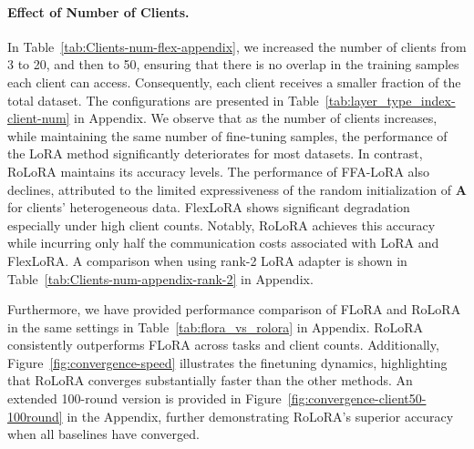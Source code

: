 \documentclass{article}
\theoremstyle{plain}
\theoremstyle{definition}
\theoremstyle{remark}
\begin{document}
\paragraph{Effect of Number of Clients.}
In Table~\ref{tab:Clients-num-flex-appendix}, we increased the number of clients from 3 to 20, and then to 50, ensuring that there is no overlap in the training samples each client can access. Consequently, each client receives a smaller fraction of the total dataset. The configurations are presented in Table~\ref{tab:layer_type_index-client-num} in Appendix. We observe that as the number of clients increases, while maintaining the same number of fine-tuning samples, the performance of the LoRA method significantly deteriorates for most datasets. In contrast, RoLoRA maintains its accuracy levels. The performance of FFA-LoRA also declines, attributed to the limited expressiveness of the random initialization of $\mathbf{A}$ for clients' heterogeneous data. FlexLoRA shows significant degradation especially under high client counts. Notably, RoLoRA achieves this accuracy while incurring only half the communication costs associated with LoRA and FlexLoRA. A comparison when using rank-2 LoRA adapter is shown in Table~\ref{tab:Clients-num-appendix-rank-2} in Appendix.

Furthermore, we have provided performance comparison of FLoRA and RoLoRA in the same settings in Table~\ref{tab:flora_vs_rolora} in Appendix. RoLoRA consistently outperforms FLoRA across tasks and client counts. 
Additionally, Figure~\ref{fig:convergence-speed} illustrates the finetuning dynamics, highlighting that RoLoRA converges substantially faster than the other methods. An extended 100-round version is provided in Figure~\ref{fig:convergence-client50-100round} in the Appendix, further demonstrating RoLoRA’s superior accuracy when all baselines have converged.
\end{document}
